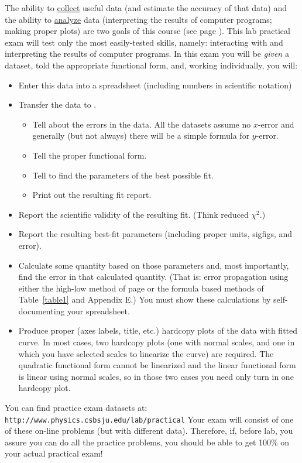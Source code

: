 \newexp

The ability to \underline{collect} useful data (and estimate the accuracy of that data) and the ability to
\underline{analyze} data (interpreting the results of computer programs; making proper plots) are
two goals of this course (see page \pageref{section:purpose}).  This lab practical exam will test
only the most easily-tested skills, namely: interacting with and interpreting the results
of computer programs.  In this exam you will be {\em given} a dataset, told the appropriate functional
form, and, working individually, you will:
\begin{itemize}
\item Enter this data into a spreadsheet (including numbers in scientific notation) 
\item Transfer the data to \WAPP.
\begin{itemize}
\item Tell \WAPP about the errors in the data. All the datasets
assume no $x$-error and generally (but not always) there will be a simple formula for $y$-error.
\item  Tell \WAPP the proper functional form.
\item Tell \WAPP to find the parameters of the best possible fit.
\item Print out the resulting fit report.
\end{itemize}
\item Report the scientific validity of the resulting fit.  (Think reduced $\chi^2$.)
\item Report the resulting best-fit parameters (including proper units, sigfigs, and error).
\item Calculate some quantity based on those parameters and, most importantly,
find the error in that calculated quantity. (That is: error propagation using either the high-low method of
page \pageref{par:high.low.game} or the formula based methods of Table~\ref{table1} and
Appendix E.)  You must show these calculations by
self-documenting your spreadsheet.
\item Produce proper (axes labels, title, etc.) hardcopy plots of the data with fitted curve.
In most cases, two hardcopy plots (one with normal scales, and one in which you have selected scales 
to linearize the curve) are required.  The quadratic functional form cannot be linearized
and the linear functional form is linear using normal scales, so in those two cases you need only turn in
one hardcopy plot.
\end{itemize}
You can find practice exam datasets at: \verb+http://www.physics.csbsju.edu/lab/practical+
Your exam will consist of one of these on-line problems (but with different data). Therefore,
if, before lab, you assure you can do all the practice problems, you should be able to
get 100\% on your actual practical exam!

